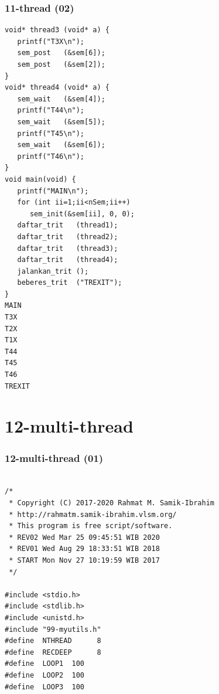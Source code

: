 \documentclass[aspectratio=169, xcolor=table, notheorems, hyperref={pdfpagelabels=false}]{beamer}
\begin{document}
\begin{frame}[fragile]
\frametitle{11-thread (02)}
\begin{lstlisting}[basicstyle=\ttfamily\tiny]
void* thread3 (void* a) {
   printf("T3X\n");
   sem_post   (&sem[6]);
   sem_post   (&sem[2]);
}
void* thread4 (void* a) {
   sem_wait   (&sem[4]);
   printf("T44\n");
   sem_wait   (&sem[5]);
   printf("T45\n");
   sem_wait   (&sem[6]);
   printf("T46\n");
}
void main(void) {
   printf("MAIN\n");
   for (int ii=1;ii<nSem;ii++)
      sem_init(&sem[ii], 0, 0);
   daftar_trit   (thread1);
   daftar_trit   (thread2);
   daftar_trit   (thread3);
   daftar_trit   (thread4);
   jalankan_trit ();
   beberes_trit  ("TREXIT");
}
MAIN
T3X
T2X
T1X
T44
T45
T46
TREXIT

\end{lstlisting}
\end{frame}

\section{12-multi-thread}
\begin{frame}[fragile]
\frametitle{12-multi-thread (01)}
\begin{lstlisting}[basicstyle=\ttfamily\small]        %  65
% \begin{lstlisting}[basicstyle=\ttfamily\large]        %  54

/*
 * Copyright (C) 2017-2020 Rahmat M. Samik-Ibrahim
 * http://rahmatm.samik-ibrahim.vlsm.org/
 * This program is free script/software.
 * REV02 Wed Mar 25 09:45:51 WIB 2020
 * REV01 Wed Aug 29 18:33:51 WIB 2018
 * START Mon Nov 27 10:19:59 WIB 2017
 */

#include <stdio.h>
#include <stdlib.h>
#include <unistd.h>
#include "99-myutils.h"
#define  NTHREAD      8
#define  RECDEEP      8
#define  LOOP1  100
#define  LOOP2  100
#define  LOOP3  100

\end{lstlisting}
\end{frame}
\end{document}
